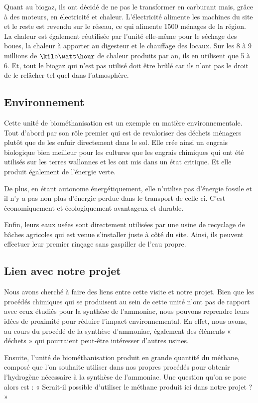 Quant au biogaz, ils ont décidé de ne pas le transformer en carburant mais, grâce à des moteurs, en électricité et chaleur. L'électricité alimente les machines du site et le reste est revendu sur le réseau, ce qui alimente 1500 ménages de la région. La chaleur est également réutilisée par l'unité elle-même pour le séchage des boues, la chaleur à apporter au digesteur et le chauffage des locaux. Sur les 8 à 9 millions de $\kilo\watt\hour$ de chaleur produits par an, ils en utilisent que 5 à 6. Et, tout le biogaz qui n'est pas utilisé doit être brûlé car ils n'ont pas le droit de le relâcher tel quel dans l'atmosphère.

\subsection{Environnement}
Cette unité de biométhanisation est un exemple en matière environnementale.
Tout d'abord par son rôle premier qui est de revaloriser des déchets ménagers plutôt que de les enfuir directement dans le sol. Elle crée ainsi un engrais biologique bien meilleur pour les cultures que les engrais chimiques qui ont été utilisés sur les terres wallonnes et les ont mis dans un état critique. Et elle produit également de l'énergie verte.

De plus, en étant autonome énergétiquement, elle n'utilise pas d'énergie fossile et il n'y a pas non plus d'énergie perdue dans le transport de celle-ci. C'est économiquement et écologiquement avantageux et durable.

Enfin, leurs eaux usées sont directement utilisées par une usine de recyclage de bâches agricoles qui est venue s'installer juste à côté du site. Ainsi, ils peuvent effectuer leur premier rinçage sans gaspiller de l'eau propre.

\subsection{Lien avec notre projet}
Nous avons cherché à faire des liens entre cette visite et notre projet. Bien que les procédés chimiques qui se produisent au sein de cette unité n'ont pas de rapport avec ceux étudiés pour la synthèse de l'ammoniac, nous pouvons reprendre leurs idées de proximité pour réduire l'impact environnemental. En effet, nous avons, au cours du procédé de la synthèse d'ammoniac, également des éléments « déchets » qui pourraient peut-être intéresser d'autres usines.


Ensuite, l'unité de biométhanisation produit en grande quantité du méthane, composé que l'on souhaite utiliser dans nos propres procédés pour obtenir l'hydrogène nécessaire à la synthèse de l'ammoniac. Une question qu'on se pose alors est : « Serait-il possible d'utiliser le méthane produit ici dans notre projet ? »


